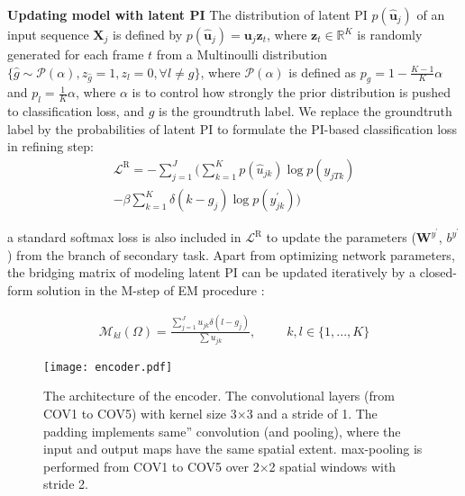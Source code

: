 \documentclass[10pt,twocolumn,letterpaper]{article}
\begin{document}
\setlength{\belowcaptionskip}{-8pt}

\noindent \textbf{Updating model with latent PI} The distribution of latent PI $p(\hat{\bm{u}}_j)$ of an input sequence $\bm{X}_j$ is defined by $p(\hat{\bm{u}}_j)=\bm{u}_j \bm{z}_t$, where $\bm{z}_t \in \mathbb{R}^K$ is randomly generated for each frame $t$ from a Multinoulli distribution $ \{ \hat{g} \sim \mathcal{P}(\alpha),  z_{\hat{g}} =1, z_l=0,  \forall l \neq g \}$, where $\mathcal{P}(\alpha)$ is defined as $p_g = 1- \frac{K-1}{K}\alpha$ and $p_l = \frac{1}{K}\alpha$, where $\alpha$ is to control how strongly the prior distribution is pushed to classification loss, and $g$ is the groundtruth label.
We replace the groundtruth label by the probabilities of latent PI to formulate the PI-based classification loss in refining step:
\vspace{-0.05cm}
\begin{align}
\mathcal{L}^{\mathrm{R}}=-\sum_{j=1}^{J}\bigg(\sum_{k=1}^{K} p(\hat{u}_{jk})\log p(y_{jTk}) \nonumber \\
-\beta\sum_{k=1}^{K} \delta(k-g_j) \log p(y_{jk}^{\prime})\bigg)
\label{eg:refine_loss}
\end{align}

a standard softmax loss is also included in $\mathcal{L}^{\mathrm{R}}$ to update the parameters (\eg $\bm{W}^{y^{\prime}}$, $b^{y^{\prime}}$) from the branch of secondary task. Apart from optimizing network parameters, the bridging matrix of modeling latent PI can be updated iteratively by a closed-form solution in the M-step of EM procedure \cite{mclachlan2007algorithm, Shi_2015_tpami,Alan_2016_icassp}:

\begin{align}
\bm{\mathcal{M}}_{kl}(\Omega) = \frac{\sum_{j=1}^{J} u_{jk} \delta(l-g_j)}{\sum u_{jk}}, \ \ \qquad  k,l \in \{1,...,K\}
\label{eg:bridge_matrix}
\end{align}

\begin{figure*}[t]
\centering
   \texttt{[image: encoder.pdf]}

\caption{The architecture of the encoder. The convolutional layers (from COV1 to COV5) with kernel size 3$\times$3 and a stride of 1. The padding implements same” convolution (and pooling), where the input and output maps have the same spatial extent. max-pooling is performed from COV1 to COV5 over 2$\times$2 spatial windows with stride 2.}
\label{fig:encoder}
\end{figure*}
\end{document}
